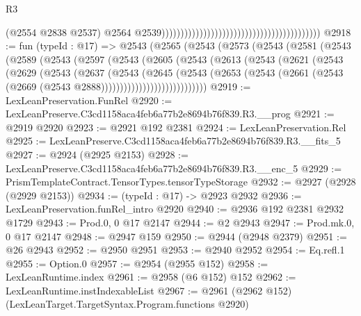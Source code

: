 \begin{lexlean}{R3}
\begin{coremodule}
                                                                                        (@2554
                                                                                          @2838
                                                                                          @2537)
                                                                                        @2564
                                                                                        @2539))))))))))))))))))))))))))))))))))))))))))
@2918 := fun (typeId : @17) =>
  @2543
    (@2565
      (@2543
        (@2573
          (@2543
            (@2581
              (@2543
                (@2589
                  (@2543
                    (@2597
                      (@2543
                        (@2605
                          (@2543
                            (@2613
                              (@2543
                                (@2621
                                  (@2543
                                    (@2629
                                      (@2543
                                        (@2637
                                          (@2543
                                            (@2645
                                              (@2543
                                                (@2653
                                                  (@2543
                                                    (@2661
                                                      (@2543
                                                        (@2669
                                                          (@2543 @2888))))))))))))))))))))))))))))
@2919 := LexLeanPreservation.FunRel
@2920 := LexLeanPreserve.C3cd1158aca4feb6a77b2e8694b76f839.R3.__prog
@2921 := @2919 @2920
@2923 := @2921 @192 @2381
@2924 := LexLeanPreservation.Rel
@2925 := LexLeanPreserve.C3cd1158aca4feb6a77b2e8694b76f839.R3.__fits_5
@2927 := @2924 (@2925 @2153)
@2928 := LexLeanPreserve.C3cd1158aca4feb6a77b2e8694b76f839.R3.__enc_5
@2929 := PrismTemplateContract.TensorTypes.tensorTypeStorage
@2932 := @2927 (@2928 (@2929 @2153))
@2934 := (typeId : @17) -> @2923 @2932
@2936 := LexLeanPreservation.funRel_intro @2920
@2940 := @2936 @192 @2381 @2932 @1729
@2943 := Prod.{0, 0} @17 @2147
@2944 := @2 @2943
@2947 := Prod.mk.{0, 0} @17 @2147
@2948 := @2947 @159
@2950 := @2944 (@2948 @2379)
@2951 := @26 @2943
@2952 := @2950 @2951
@2953 := @2940 @2952
@2954 := Eq.refl.{1}
@2955 := Option.{0}
@2957 := @2954 (@2955 @152)
@2958 := LexLeanRuntime.index
@2961 := @2958 (@6 @152) @152
@2962 := LexLeanRuntime.instIndexableList
@2967 := @2961 (@2962 @152) (LexLeanTarget.TargetSyntax.Program.functions @2920)

\end{coremodule}
\end{lexlean}
